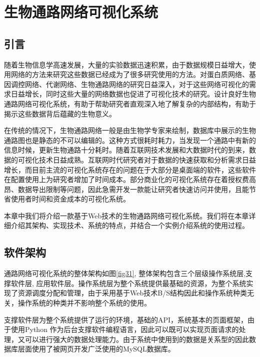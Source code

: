 \chapter{生物通路网络可视化系统}
\section{引言}
随着生物信息学高速发展，大量的实验数据迅速积累，由于数据规模日益增大，使用网络的方法来研究这些数据已经成为了很多研究使用的方法。对蛋白质网络、基因调控网络、代谢网络、生物通路网络的研究日益深入，对于这些网络可视化的需求日益增长，同时这些大量的网络数据也促进了可视化技术的研究。设计良好生物通路网络可视化系统，有助于帮助研究者直观深入地了解复杂的内部结构，有助于揭示这些数据背后蕴藏的生物意义。

在传统的情况下，生物通路网络一般是由生物学专家来绘制，数据库中展示的生物通路图也是静态的不可以编辑的。这种方式很耗时耗力，当发现一个通路中有新的信息时候，更新生物通路十分耗时。随着互联网技术发展和大数据时代的到来，数据的可视化技术日益成熟。互联网时代研究者对于数据的快速获取和分析需求日益增长，而目前主流的可视化系统存在的问题在于大部分是桌面端的软件，这些软件在配置使用上为研究者增加了时间成本。部分商业化的可视化系统存在着授权费高昂、数据导出限制等问题，因此急需开发一款能让研究者快速访问并使用，且能节省使用者时间和资金成本的可视化系统。

本章中我们将介绍一款基于Web技术的生物通路网络可视化系统。我们将在本章详细介绍其架构、实现技术、系统的特点，并结合一个实例介绍系统的使用过程。

\section{软件架构}
通路网络可视化系统的整体架构如图\ref{fig31}, 整体架构包含三个层级操作系统层,支撑软件层, 应用软件层。操作系统层为整个系统提供最基础的资源，为整个系统实现了资源调度分配和管理，由于采用基于Web技术B/S结构因此和操作系统种类无关，操作系统的种类并不影响整个系统的使用。

支撑软件层为整个系统提供了运行的环境，基础的API，系统基本的页面框架，由于使用Python 作为后台支撑软件编程语言，因此可以既可以实现页面请求的处理，又可以进行强大的数据处理能力。由于系统中使用到的数据是关系型的因此数据库层面使用了被网页开发广泛使用的MySQL数据库。

